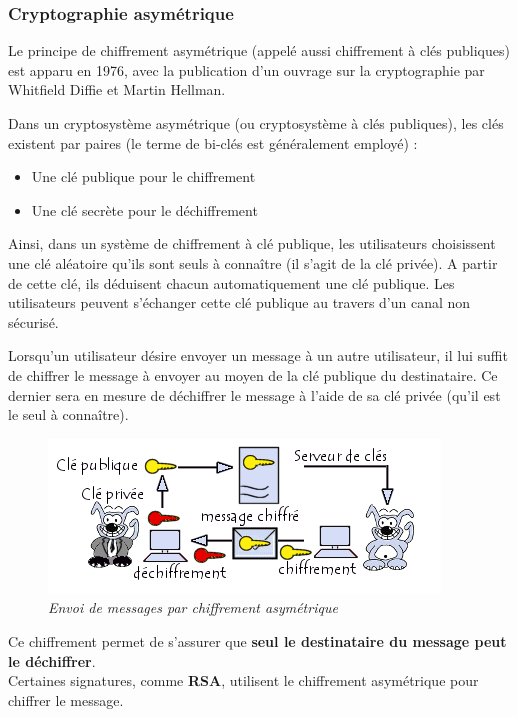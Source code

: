 \documentclass[conference]{IEEEtran}
\begin{document}
\subsubsection{Cryptographie asymétrique}
Le principe de chiffrement asymétrique (appelé aussi chiffrement à clés publiques) est apparu en 1976, avec la publication d'un ouvrage sur la cryptographie par Whitfield Diffie et Martin Hellman\cite{ccmasym, clepub}. 


Dans un cryptosystème asymétrique (ou cryptosystème à clés publiques), les clés existent par paires (le terme de bi-clés est généralement employé) :
\begin{itemize}
    \item Une clé publique pour le chiffrement
     \item Une clé secrète pour le déchiffrement
\end{itemize}
    
Ainsi, dans un système de chiffrement à clé publique, les utilisateurs choisissent une clé aléatoire qu'ils sont seuls à connaître (il s'agit de la clé privée). A partir de cette clé, ils déduisent chacun automatiquement une clé publique. Les utilisateurs peuvent s'échanger cette clé publique au travers d'un canal non sécurisé.

Lorsqu'un utilisateur désire envoyer un message à un autre utilisateur, il lui suffit de chiffrer le message à envoyer au moyen de la clé publique du destinataire. Ce dernier sera en mesure de déchiffrer le message à l'aide de sa clé privée (qu'il est le seul à connaître)\cite{ccmasym}. 

\begin{figure}[!h]
    \centering
    \includegraphics[scale=0.7]{asym.PNG}
    \caption{\textit{Envoi de messages par chiffrement asymétrique} \cite{ccmasym}}
    \label{fig:asym}
\end{figure}

Ce chiffrement permet de s'assurer que \textbf{seul le destinataire du message peut le déchiffrer}. \\
Certaines signatures, comme \textbf{RSA}, utilisent le chiffrement asymétrique pour chiffrer le message.
\end{document}
